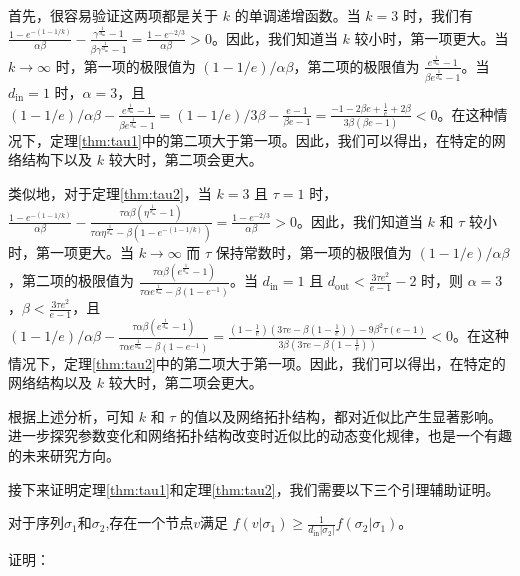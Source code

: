 首先，很容易验证这两项都是关于 $k$ 的单调递增函数。当 $k=3$ 时，我们有 $\frac{1-e^{-(1-1/k)}}{\alpha\beta}-\frac{\gamma^{\frac{1}{d_{\text{in}}}}-1}{\beta \gamma^{\frac{1}{d_{\text{in}}}}-1} = \frac{1-e^{-2/3}}{\alpha \beta}>0$。因此，我们知道当 $k$ 较小时，第一项更大。当 $k \to \infty$ 时，第一项的极限值为 $(1-1/e)/\alpha\beta$，第二项的极限值为 $\frac{e^{\frac{1}{d_{\text{in}}}}-1}{\beta e^{\frac{1}{d_{\text{in}}}}-1}$。当 $d_{\text{in}}=1$ 时，$\alpha=3$，且 $(1-1/e)/\alpha\beta-\frac{e^{\frac{1}{d_{\text{in}}}}-1}{\beta e^{\frac{1}{d_{\text{in}}}}-1} =(1-1/e)/3\beta-\frac{e-1}{\beta e-1}=\frac{-1-2\beta e +\frac{1}{e}+2\beta}{3\beta(\beta e-1)}<0$。在这种情况下，定理\ref{thm:tau1}中的第二项大于第一项。因此，我们可以得出，在特定的网络结构下以及 $k$ 较大时，第二项会更大。

类似地，对于定理\ref{thm:tau2}，当 $k=3$ 且 $\tau=1$ 时，$\frac{1-e^{-(1-1/k)}}{\alpha\beta}-\frac{\tau\alpha\beta(\eta^{\frac{1}{d_{\text{in}}}}-1)}{\tau\alpha\eta^{\frac{1}{d_{\text{in}}}}- \beta (1-e^{-(1-1/k)})} = \frac{1-e^{-2/3}}{\alpha \beta}>0$。因此，我们知道当 $k$ 和 $\tau$ 较小时，第一项更大。当 $k \to \infty$ 而 $\tau$ 保持常数时，第一项的极限值为 $(1-1/e)/\alpha\beta$，第二项的极限值为 $\frac{\tau\alpha\beta(e^{\frac{1}{d_{\text{in}}}}-1)}{\tau\alpha e^{\frac{1}{d_{\text{in}}}}- \beta (1-e^{-1}) }$。当 $d_{\text{in}}=1$ 且 $d_{\text{out}}<\frac{3\tau e^2}{e-1}-2$ 时，则 $\alpha=3$，$\beta < \frac{3\tau e^2}{e-1}$，且 $(1-1/e)/\alpha\beta-\frac{\tau\alpha\beta(e^{\frac{1}{d_{\text{in}}}}-1)}{\tau\alpha e^{\frac{1}{d_{\text{in}}}}- \beta (1-e^{-1}) } = \frac{(1-\frac{1}{e})(3\tau e -\beta(1-\frac{1}{e}))-9\beta^2 \tau(e-1)}{3\beta(3\tau e -\beta(1-\frac{1}{e}))}<0$。在这种情况下，定理\ref{thm:tau2}中的第二项大于第一项。因此，我们可以得出，在特定的网络结构以及 $k$ 较大时，第二项会更大。

根据上述分析，可知 $k$ 和 $\tau$ 的值以及网络拓扑结构，都对近似比产生显著影响。进一步探究参数变化和网络拓扑结构改变时近似比的动态变化规律，也是一个有趣的未来研究方向。

接下来证明定理\ref{thm:tau1}和定理\ref{thm:tau2}，我们需要以下三个引理辅助证明。

\begin{lemma}
\label{lem:lem1}
对于序列$\sigma_1$和$\sigma_2$,存在一个节点$v$满足 $f(v|\sigma_1) \ge \frac{1}{d_{\text{in}}|\sigma_2|} f(\sigma_2|\sigma_1)$。
\end{lemma}

\noindent 证明：

